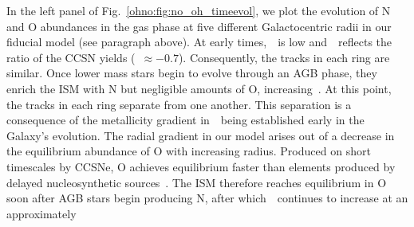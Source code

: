 \par
In the left panel of Fig.~\ref{ohno:fig:no_oh_timeevol}, we plot the evolution of N
and O abundances in the gas phase at five different Galactocentric radii
in our fiducial model (see paragraph above).
At early times,~\oh~is low and~\no~reflects the ratio of the CCSN yields
(\no\subcc~$\approx -0.7$).
Consequently, the tracks in each ring are similar.
Once lower mass stars begin to evolve through an AGB phase, they enrich the
ISM with N but negligible amounts of O, increasing~\no.
At this point, the tracks in each ring separate from one another.
This separation is a consequence of the metallicity gradient in~\oh~being
established early in the Galaxy's evolution.
The radial gradient in our model arises out of a decrease in the equilibrium
abundance of O with increasing radius.
Produced on short timescales by CCSNe, O achieves equilibrium faster than
elements produced by delayed nucleosynthetic sources~\citep{Weinberg2017b}.
The ISM therefore reaches equilibrium in O soon after AGB stars begin
producing N, after which~\no~continues to increase at an approximately
